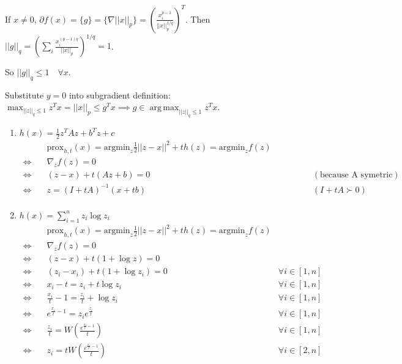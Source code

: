 \documentclass[12pt,letterpaper]{article}
\DeclareMathOperator*{\argmax}{arg\,max}
\begin{document}
\begin{alphalist}
\begin{enumerate}[label=(\roman*)]
        If $x \ne 0$, $\partial{}f(x) = \{g\} = \{\nabla{}||x||_p\} = \left(
        \frac{x_i^{p-1}}{||x||_p^{1/q}} \right)^T$. Then $||g||_q =
        \left( \sum_i\frac{x_i^{(p-1)q}}{||x||_p} \right)^{1/q} = 1$.


        So $||g||_q \le 1 \quad \forall x$.


        Substitute $y = 0$ into subgradient definition: $\max_{||z||_q
        \le 1} z^Tx = ||x||_p \le g^Tx \implies g \in \argmax_{||z||_q \le 1}
        z^Tx$.

\end{enumerate}

\item
\begin{enumerate}[label=(\roman*)]
    \item $h(x) = \frac{1}{2}z^TAz + b^Tz +c$
        \begin{align*}
            &\text{prox}_{h,t}(x) = \text{argmin}_z \frac{1}{2}||z-x||^2 + th(z) = \text{argmin}_z f(z)\\
            \iff \quad &\nabla_z f(z) = 0 \\
            \iff \quad &(z -x) + t(Az + b) = 0 &\qquad\qquad (\text{because A symetric}) \\
            \iff \quad &z = (I + tA)^{-1} (x + tb) &\qquad\qquad (I + tA \succ 0)\\
        \end{align*}

    \item $h(x) = \sum_{i=1}^nz_i\log{}z_i$
        \begin{align*}
            &\text{prox}_{h,t}(x) = \text{argmin}_z \frac{1}{2}||z-x||^2 + th(z) = \text{argmin}_z f(z)\\
            \iff \quad &\nabla_z f(z) = 0 \\
            \iff \quad &(z -x) + t(1 + \log{}z) = 0 \\
            \iff \quad &(z_i -x_i) + t(1 + \log{}z_i) = 0 \quad &\forall i \in [1, n]\\
            \iff \quad &x_i - t = z_i + t \log{}z_i \quad &\forall i \in [1, n]\\
            \iff \quad &\frac{x_i}{t} - 1 = \frac{z_i}{t} + \log{}z_i \quad &\forall i \in [1, n]\\
            \iff \quad &e^{\frac{x_i}{t} - 1} = z_i e^{\frac{z_i}{t}} \quad &\forall i \in [1, n]\\
            \iff \quad &\frac{z_i}{t} = W\left(\frac{e^{\frac{x_i}{t} - 1}}{t}\right) \quad &\forall i \in [1, n]\\
            \iff \quad &z_i = tW\left(\frac{e^{\frac{x_i}{t} - 1}}{t}\right) \quad &\forall i \in [2, n]
        \end{align*}


\end{enumerate}
\end{alphalist}
\end{document}
